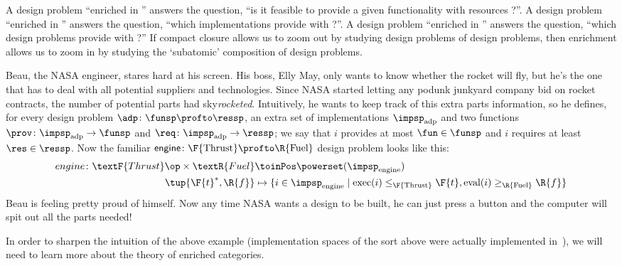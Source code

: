 \label{sec:enriched}
A design problem ``enriched in \Bool'' answers the question, ``is it feasible to provide a given functionality \fun with resources \res?''. A design problem ``enriched in \Set'' answers the question, ``which implementations provide \fun with \res?''. A design problem ``enriched in \DP'' answers the question, ``which design problems provide \fun with \res?'' If compact closure allows us to zoom out by studying design problems of design problems, then enrichment allows us to zoom in by studying the `subatomic' composition of design problems.

\begin{example}
    \label{ex:dpi_example}
    Beau, the NASA engineer, stares hard at his screen. His boss, Elly May, only wants to know whether the rocket will fly, but he's the one that has to deal with all potential suppliers and technologies. Since NASA started letting any podunk junkyard company bid on rocket contracts, the number of potential parts had sky\emph{rocketed}. Intuitively, he wants to keep track of this extra parts information, so he defines, for every design problem $\adp \colon \funsp \profto \ressp$, an extra set of implementations $\impsp_\text{adp}$ and two functions $\prov\colon \impsp_\text{adp} \to \funsp$ and  $\req\colon \impsp_\text{adp} \to \ressp$; we say that $i$ provides at most $\fun \in \funsp$ and $i$ requires at least $\res \in \ressp$. Now the familiar $\mathsf{engine} \colon \F{\text{Thrust}} \profto \R{\text{Fuel}}$ design problem looks like this:
    \begin{equation}
        \begin{aligned}
            engine \colon \textF{Thrust}\op \times \textR{Fuel} &\toinPos \powerset(\impsp_\text{engine}) \\
            \tup{\F{t}^*,\R{f}} &\mapsto \{ i \in \impsp_\text{engine} \mid \text{exec}(i) \leq_\F{\text{Thrust}} \F{t}, \text{eval}(i) \geq_\R{\text{Fuel}} \R{f} \}
        \end{aligned}
    \end{equation}
    Beau is feeling pretty proud of himself. Now any time NASA wants a design to be built, he can just press a button and the computer will spit out all the parts needed!
\end{example}

In order to sharpen the intuition of the above example (implementation spaces of the sort above were actually implemented in~\cite{censi}), we will need to learn more about the theory of enriched categories.


